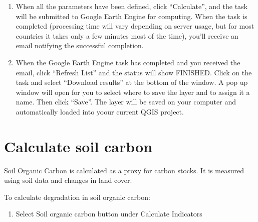 \documentclass[letterpaper,10pt,english]{sphinxmanual}
\begin{document}
\begin{enumerate}
%
\setcounter{enumi}{6}
\item {} 
\sphinxAtStartPar
When all the parameters have been defined, click “Calculate”, and the task
will be submitted to Google Earth Engine for computing. When the task is
completed (processing time will vary depending on server usage, but for most
countries it takes only a few minutes most of the time), you’ll receive an
email notifying the successful completion.

\item {} 
\sphinxAtStartPar
When the Google Earth Engine task has completed and you received the email,
click “Refresh List” and the status will show FINISHED. Click on the task
and select “Download results” at the bottom of the window. A pop up window
will open for you to select where to save the layer and to assign it a name.
Then click “Save”. The layer will be saved on your computer and
automatically loaded into yoour current QGIS project.

\end{enumerate}



\section{Calculate soil carbon}
\label{\detokenize{Qgis_Plugin/Calculate_sdg15:calculate-soil-carbon}}
\sphinxAtStartPar
Soil Organic Carbon is calculated as a proxy for carbon stocks. It is measured
using soil data and changes in land cover.

\sphinxAtStartPar
To calculate degradation in soil organic carbon:

\begin{enumerate}
%
\item {} 
\sphinxAtStartPar
Select Soil organic carbon button under Calculate Indicators

\end{enumerate}
\end{document}
